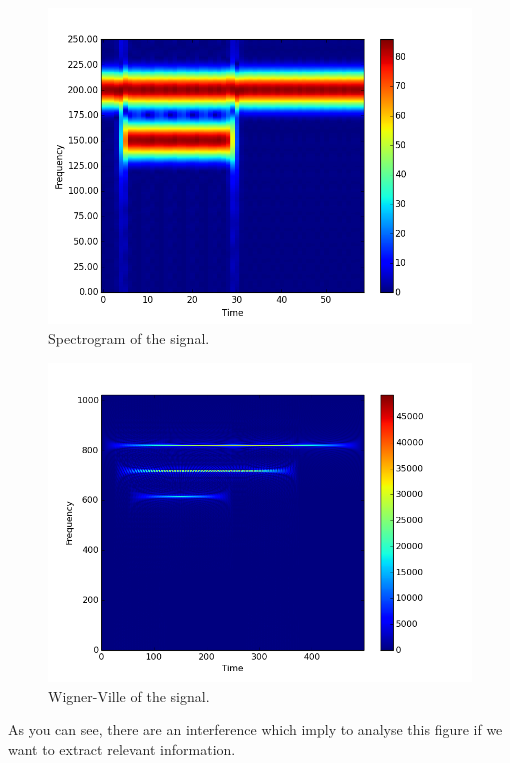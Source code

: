 \begin{figure}[H]
\centering
    \includegraphics[scale=0.5,angle=0]{Images/figure_6STFT.png}
    \caption{Spectrogram of the signal.}
    \label{fig:SignalSimple_Spectrogram}
\end{figure}

\begin{figure}[H]
\centering
    \includegraphics[scale=0.5,angle=0]{Images/SignalSimple_WV.png}
    \caption{Wigner-Ville of the signal.}
    \label{fig:SignalSimple_WV}
\end{figure}

As you can see, there are an interference which imply to analyse this figure if we want to extract relevant information.

